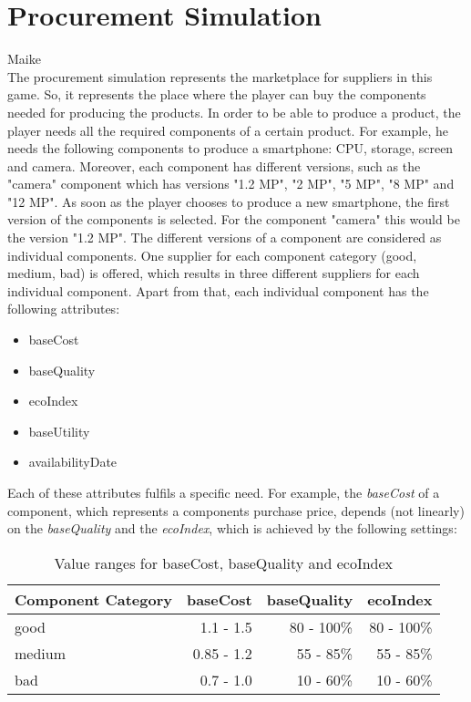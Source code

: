 \section{Procurement Simulation}
\label{procuresim}
Maike\\
The procurement simulation represents the marketplace for suppliers in this game. So, it represents the place where the player can buy the components needed for producing the products. In order to be able to produce a product, the player needs all the required components of a certain product. For example, he needs the following components to produce a smartphone: CPU, storage, screen and camera. Moreover, each component has different versions, such as the "camera" component which has versions "1.2 MP", "2 MP", "5 MP", "8 MP" and "12 MP".  As soon as the player chooses to produce a new smartphone, the first version of the components is selected. For the component "camera" this would be the version "1.2 MP". The different versions of a component are considered as individual components. One supplier for each component category (good, medium, bad) is offered, which results in three different suppliers for each individual component. Apart from that, each individual component has the following attributes:
\begin{itemize}
    \item baseCost
    \item baseQuality
    \item ecoIndex
    \item baseUtility
    \item availabilityDate
\end{itemize}
Each of these attributes fulfils a specific need. For example, the \textit{baseCost} of a component, which represents a components purchase price, depends (not linearly) on the \textit{baseQuality} and the \textit{ecoIndex}, which is achieved by the following settings:
    \begin{table}[ht]
    \centering
    \begin{tabular}{|l|r|r|r|}
    \hline
    Component Category & baseCost & baseQuality & ecoIndex \\
    \hline
    good & 1.1 - 1.5 & 80 - 100\% & 80 - 100\% \\
    medium & 0.85 - 1.2 & 55 - 85\% & 55 - 85\%\\
    bad  & 0.7 - 1.0 & 10 - 60\% & 10 - 60\%\\
    \hline
    \end{tabular}
    \caption{Value ranges for baseCost, baseQuality and ecoIndex}
    \label{component_price_calculation}
    \end{table}
